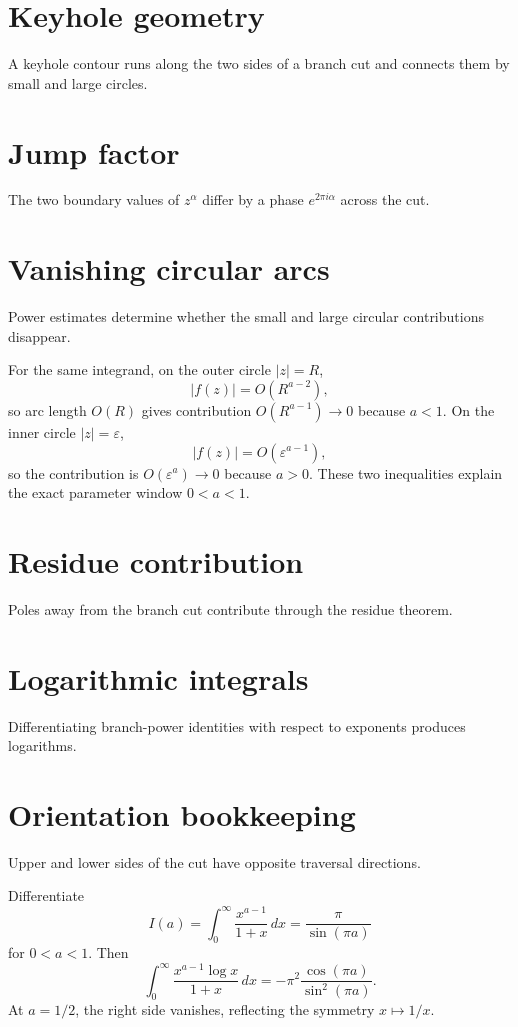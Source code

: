 \section{Keyhole geometry}
A keyhole contour runs along the two sides of a branch cut and connects them by small and large circles.

\section{Jump factor}
The two boundary values of $z^\alpha$ differ by a phase $e^{2\pi i\alpha}$ across the cut.

\section{Vanishing circular arcs}
Power estimates determine whether the small and large circular contributions disappear.

\begin{example}\label{ex:iv21-expand-02}
For the same integrand, on the outer circle \(|z|=R\),
\[
|f(z)|=O(R^{a-2}),
\]
so arc length \(O(R)\) gives contribution \(O(R^{a-1})\to0\) because \(a<1\). On the inner circle \(|z|=\varepsilon\),
\[
|f(z)|=O(\varepsilon^{a-1}),
\]
so the contribution is \(O(\varepsilon^a)\to0\) because \(a>0\). These two inequalities explain the exact parameter window \(0<a<1\).
\end{example}
\section{Residue contribution}
Poles away from the branch cut contribute through the residue theorem.

\section{Logarithmic integrals}
Differentiating branch-power identities with respect to exponents produces logarithms.

\section{Orientation bookkeeping}
Upper and lower sides of the cut have opposite traversal directions.

\begin{example}\label{ex:iv21-expand-03}
Differentiate
\[
I(a)=\int_0^\infty \frac{x^{a-1}}{1+x}\,dx=\frac{\pi}{\sin(\pi a)}
\]
for \(0<a<1\). Then
\[
\int_0^\infty \frac{x^{a-1}\log x}{1+x}\,dx
=-\pi^2\frac{\cos(\pi a)}{\sin^2(\pi a)}.
\]
At \(a=1/2\), the right side vanishes, reflecting the symmetry \(x\mapsto1/x\).
\end{example}
